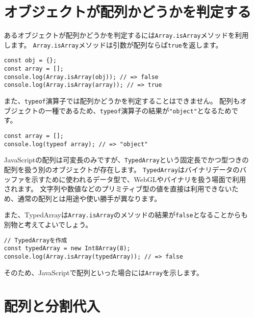 \hypertarget{detect-array}{%
\section{オブジェクトが配列かどうかを判定する}\label{detect-array}}

あるオブジェクトが配列かどうかを判定するには\texttt{Array.isArray}メソッドを利用します。
\texttt{Array.isArray}メソッドは引数が配列ならば\texttt{true}を返します。

\begin{lstlisting}
const obj = {};
const array = [];
console.log(Array.isArray(obj)); // => false
console.log(Array.isArray(array)); // => true
\end{lstlisting}

また、\texttt{typeof}演算子では配列かどうかを判定することはできません。
配列もオブジェクトの一種であるため、\texttt{typeof}演算子の結果が\texttt{"object"}となるためです。

\begin{lstlisting}
const array = [];
console.log(typeof array); // => "object"
\end{lstlisting}

\begin{tcolorbox}[title=TypedArray\,\protect\icon{fig/es2015.eps}]\label{typed-array}

JavaScriptの配列は可変長のみですが、\texttt{TypedArray}という固定長でかつ型つきの配列を扱う別のオブジェクトが存在します。
\texttt{TypedArray}はバイナリデータのバッファを示すために使われるデータ型で、WebGLやバイナリを扱う場面で利用されます。
文字列や数値などのプリミティブ型の値を直接は利用できないため、通常の配列とは用途や使い勝手が異なります。

また、TypedArrayは\texttt{Array.isArray}のメソッドの結果が\texttt{false}となることからも別物と考えてよいでしょう。

\begin{lstlisting}
// TypedArrayを作成
const typedArray = new Int8Array(8);
console.log(Array.isArray(typedArray)); // => false
\end{lstlisting}

そのため、JavaScriptで配列といった場合には\texttt{Array}を示します。
\end{tcolorbox}

\hypertarget{array-destructuring}{%
\section[配列と分割代入]{配列と分割代入\,\protect{}}\label{array-destructuring}}

